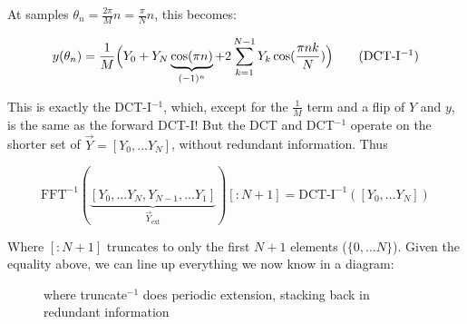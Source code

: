 \documentclass[10pt]{article}
\begin{document}
At samples $\theta_n = \frac{2\pi}{M}n = \frac{\pi}{N}n$, this becomes:

\[
y(\theta_n) = \frac{1}{M} \Big(Y_0 + Y_N\underbrace{\cos(\pi n)}_{(-1)^n} + 2 \sum_{k = 1}^{N-1} Y_k \cos(\frac{\pi nk}{N}) \Big) \tag{DCT-I$^{-1}$}
\]

This is exactly the DCT-I$^{-1}$, which, except for the $\frac{1}{M}$ term and a flip of $Y$ and $y$, is the same as the forward DCT-I! But the DCT and DCT$^{-1}$ operate on the shorter set of $\vec{Y} = [Y_0, ... Y_N]$, without redundant information. Thus

\begin{equation}\label{ifftidct}
\text{FFT}^{-1}(\underbrace{[Y_0, ... Y_N, Y_{N-1}, ... Y_1]}_{\vec{Y}_{\text{ext}}})[:\!N+1] = \text{DCT-I}^{-1}([Y_0, ... Y_N])
\end{equation}

Where $[:\!N+1]$ truncates to only the first $N+1$ elements ($\{0, ... N\}$). Given the equality above, we can line up everything we now know in a diagram:

\begin{figure}[h!]
\begin{center}
\begin{minipage}{0.5\textwidth}
\centering
{}
\end{minipage}
\begin{minipage}{0.3\textwidth}\raggedright where truncate$^{-1}$ does periodic extension, stacking back in redundant information\end{minipage}
\end{center}
\end{figure}\vspace{-2mm}
\end{document}
